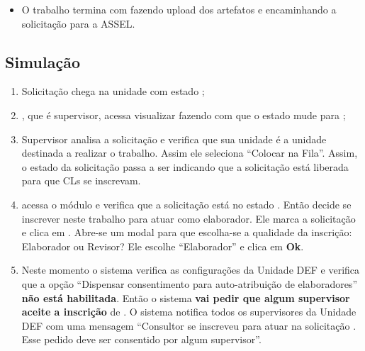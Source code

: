 \begin{landscape}
\begin{itemize}
	\item O trabalho termina com \EU fazendo upload dos artefatos e \SC encaminhando a solicitação para a ASSEL.

\end{itemize}

\subsection*{Simulação}

\begin{enumerate}
	\item Solicitação \SOLT chega na unidade com estado ;


	\item \SC, que é supervisor, acessa visualizar fazendo com que o estado mude para ;


	\item Supervisor \SC analisa a solicitação e verifica que sua unidade é a unidade destinada a realizar o trabalho. Assim ele seleciona ``Colocar na Fila''. Assim, o estado da solicitação passa a ser  indicando que a solicitação está liberada para que CLs se inscrevam.


	\item \EU acessa o módulo e verifica que a solicitação \SOLT está no estado . Então decide se inscrever neste trabalho para atuar como elaborador. Ele marca a solicitação e clica em \bInscrever. Abre-se um modal para que escolha-se a qualidade da inscrição: Elaborador ou Revisor? Ele escolhe ``Elaborador'' e clica em \textbf{Ok}. 

	\item Neste momento o sistema verifica as configurações da Unidade DEF e verifica que a opção ``Dispensar consentimento para auto-atribuição de elaboradores'' \textbf{não está habilitada}. Então o sistema \textbf{vai pedir que algum supervisor aceite a inscrição} de \EU. O sistema notifica todos os supervisores da Unidade DEF com uma mensagem ``Consultor \EU se inscreveu para atuar na solicitação \SOLT. Esse pedido deve ser consentido por algum supervisor''.
	

\end{enumerate}
\end{landscape}
